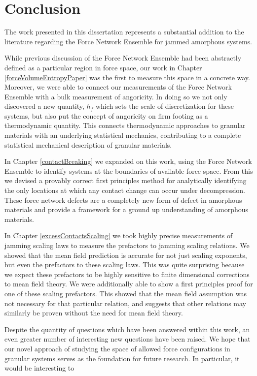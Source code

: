 \chapter{Conclusion}

The work presented in this dissertation represents a substantial addition to the literature regarding the Force Network Ensemble for jammed amorphous systems. 

While previous discussion of the Force Network Ensemble had been abstractly defined as a particular region in force space, our work in Chapter \ref{forceVolumeEntropyPaper} was the first to measure this space in a concrete way. Moreover, we were able to connect our measurements of the Force Network Ensemble with a bulk measurement of angoricity. In doing so we not only discovered a new quantity, $h_f$ which sets the scale of discretization for these systems, but also put the concept of angoricity on firm footing as a thermodynamic quantity. This connects thermodynamic approaches to granular materials with an underlying statistical mechanics, contributing to a complete statistical mechanical description of granular materials.

In Chapter \ref{contactBreaking} we expanded on this work, using the Force Network Ensemble to identify systems at the boundaries of available force space. From this we devised a provably correct first principles method for analytically identifying the only locations at which any contact change can occur under decompression. These force network defects are a completely new form of defect in amorphous materials and provide a framework for a ground up understanding of amorphous materials.

In Chapter \ref{excessContactsScaling} we took highly precise measurements of jamming scaling laws to measure the prefactors to jamming scaling relations. We showed that the mean field prediction is accurate for not just scaling exponents, but even the prefactors to these scaling laws. This was quite surprising because we expect these prefactors to be highly sensitive to finite dimensional corrections to mean field theory. We were additionally able to show a first principles proof for one of these scaling prefactors. This showed that the mean field assumption was not necessary for that particular relation, and suggests that other relations may similarly be proven without the need for mean field theory.

Despite the quantity of questions which have been answered within this work, an even greater number of interesting new questions have been raised. We hope that our novel approach of studying the space of allowed force configurations in granular systems serves as the foundation for future research. In particular, it would be interesting to 



